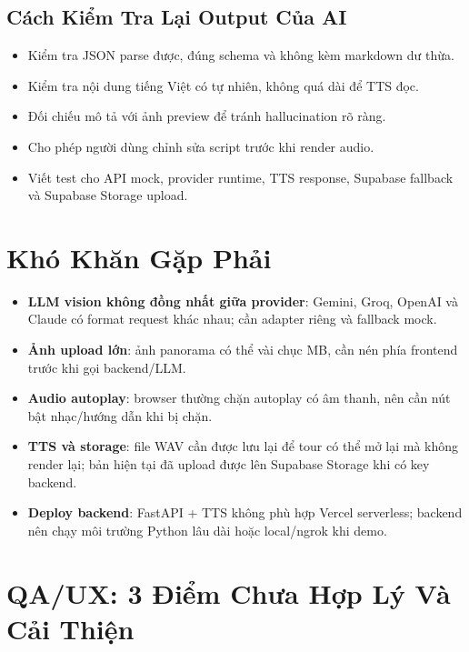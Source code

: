 \documentclass[12pt,a4paper]{article}
\begin{document}
\subsection{Cách Kiểm Tra Lại Output Của AI}

\begin{itemize}
  \item Kiểm tra JSON parse được, đúng schema và không kèm markdown dư thừa.
  \item Kiểm tra nội dung tiếng Việt có tự nhiên, không quá dài để TTS đọc.
  \item Đối chiếu mô tả với ảnh preview để tránh hallucination rõ ràng.
  \item Cho phép người dùng chỉnh sửa script trước khi render audio.
  \item Viết test cho API mock, provider runtime, TTS response, Supabase fallback và Supabase Storage upload.
\end{itemize}

\section{Khó Khăn Gặp Phải}

\begin{itemize}
  \item \textbf{LLM vision không đồng nhất giữa provider}: Gemini, Groq, OpenAI và Claude có format request khác nhau; cần adapter riêng và fallback mock.
  \item \textbf{Ảnh upload lớn}: ảnh panorama có thể vài chục MB, cần nén phía frontend trước khi gọi backend/LLM.
  \item \textbf{Audio autoplay}: browser thường chặn autoplay có âm thanh, nên cần nút bật nhạc/hướng dẫn khi bị chặn.
  \item \textbf{TTS và storage}: file WAV cần được lưu lại để tour có thể mở lại mà không render lại; bản hiện tại đã upload được lên Supabase Storage khi có key backend.
  \item \textbf{Deploy backend}: FastAPI + TTS không phù hợp Vercel serverless; backend nên chạy môi trường Python lâu dài hoặc local/ngrok khi demo.
\end{itemize}

\section{QA/UX: 3 Điểm Chưa Hợp Lý Và Cải Thiện}
\end{document}
